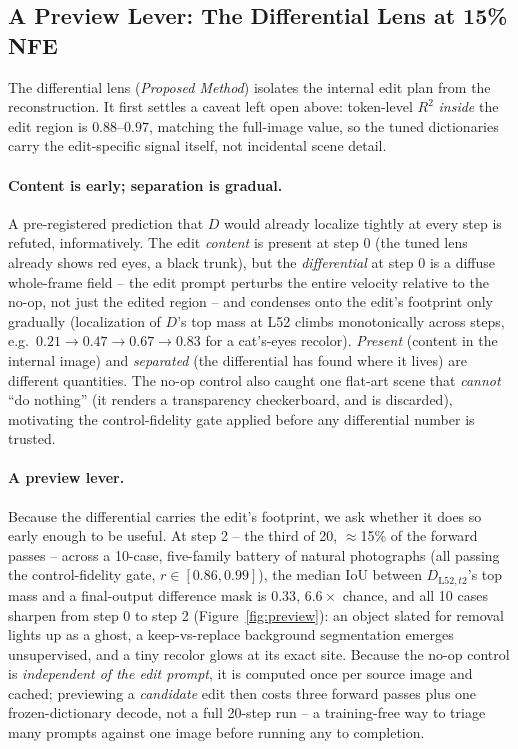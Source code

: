 \subsection{A Preview Lever: The Differential Lens at 15\% NFE}\label{sec:difflens}

The differential lens (\emph{Proposed Method}) isolates the internal
edit plan from the reconstruction. It first settles a caveat left open
above: token-level $R^2$ \emph{inside} the edit region is
$0.88$--$0.97$, matching the full-image value, so the tuned
dictionaries carry the edit-specific signal itself, not incidental
scene detail.

\paragraph{Content is early; separation is gradual.} A pre-registered
prediction that $D$ would already localize tightly at every step is
refuted, informatively. The edit \emph{content} is present at step 0 (the
tuned lens already shows red eyes, a black trunk), but the
\emph{differential} at step 0 is a diffuse whole-frame field -- the edit
prompt perturbs the entire velocity relative to the no-op, not just the
edited region -- and condenses onto the edit's footprint only gradually
(localization of $D$'s top mass at L52 climbs monotonically across steps,
e.g.\ $0.21{\to}0.47{\to}0.67{\to}0.83$ for a cat's-eyes recolor).
\emph{Present} (content in the internal image) and \emph{separated}
(the differential has found where it lives) are different quantities.
The no-op control also caught one flat-art scene that \emph{cannot}
``do nothing'' (it renders a transparency checkerboard, and is
discarded), motivating the control-fidelity gate applied before any
differential number is trusted.

\paragraph{A preview lever.} Because the differential carries the edit's
footprint, we ask whether it does so early enough to be useful. At step 2
-- the third of 20, $\approx$15\% of the forward passes -- across a
10-case, five-family battery of natural photographs (all passing the
control-fidelity gate, $r\in[0.86,0.99]$), the median IoU between
$D_{\text{L52},t2}$'s top mass and a final-output difference mask is $0.33$,
$6.6\times$ chance, and all 10 cases sharpen from step 0 to step 2
(Figure~\ref{fig:preview}): an object slated for removal lights up as a
ghost, a keep-vs-replace background segmentation emerges unsupervised, and
a tiny recolor glows at its exact site. Because the no-op control is
\emph{independent of the edit prompt}, it is computed once per source
image and cached; previewing a \emph{candidate} edit then costs three
forward passes plus one frozen-dictionary decode, not a full 20-step run
-- a training-free way to triage many prompts against one image before
running any to completion.

